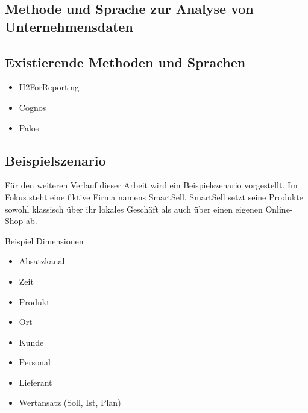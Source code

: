 \documentclass[
  language=german, %
  type=bachelor%
]{isthesis}
\begin{document}
\begin{content}
% 








  \chapter{Methode und Sprache zur Analyse von Unternehmensdaten}
  \section{Existierende Methoden und Sprachen}
  \begin{itemize}
    \item H2ForReporting
    \item Cognos
    \item Palos
  \end{itemize}

  \section{Beispielszenario}
  Für den weiteren Verlauf dieser Arbeit wird ein Beispielszenario vorgestellt. Im
  Fokus steht eine fiktive Firma namens SmartSell. SmartSell setzt seine
  Produkte sowohl klassisch über ihr lokales Geschäft als auch über einen
  eigenen Online-Shop ab.

  Beispiel Dimensionen
  \begin{itemize}
    \item Absatzkanal
    \item Zeit
    \item Produkt
    \item Ort
    \item Kunde
    \item Personal
    \item Lieferant
    \item Wertansatz (Soll, Ist, Plan)
  \end{itemize}


\end{content}
\end{document}
